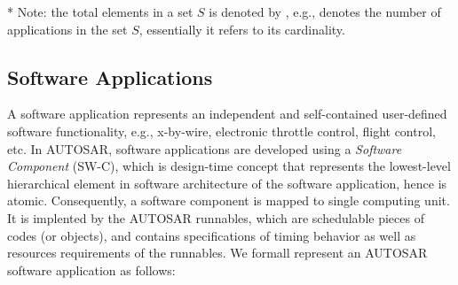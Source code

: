 {\footnotesize 
* Note: the total elements in a set $S$ is denoted by , e.g.,  denotes the number of applications in the set $S$, essentially it refers to its cardinality.}

\subsection{Software Applications}
A software application represents an independent and self-contained user-defined software functionality, e.g., x-by-wire, electronic throttle control, flight control, etc. In AUTOSAR, software applications are developed using a \textit{Software Component} (SW-C), which is design-time concept that represents the lowest-level hierarchical element in software architecture of the software application, hence is atomic. Consequently, a software component is mapped to single computing unit. It is implented by the AUTOSAR runnables, which are schedulable pieces of codes (or objects), and contains specifications of timing behavior as well as resources requirements of the runnables. We formall represent an AUTOSAR software application as follows:

